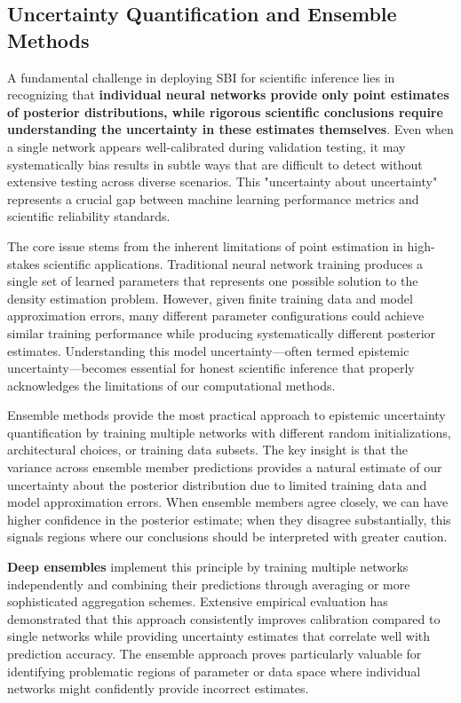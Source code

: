 \documentclass{SciPost}
\begin{document}
\subsection{Uncertainty Quantification and Ensemble Methods}

A fundamental challenge in deploying SBI for scientific inference lies in recognizing that \textbf{individual neural networks provide only point estimates of posterior distributions, while rigorous scientific conclusions require understanding the uncertainty in these estimates themselves}. Even when a single network appears well-calibrated during validation testing, it may systematically bias results in subtle ways that are difficult to detect without extensive testing across diverse scenarios. This "uncertainty about uncertainty" represents a crucial gap between machine learning performance metrics and scientific reliability standards.

The core issue stems from the inherent limitations of point estimation in high-stakes scientific applications. Traditional neural network training produces a single set of learned parameters that represents one possible solution to the density estimation problem. However, given finite training data and model approximation errors, many different parameter configurations could achieve similar training performance while producing systematically different posterior estimates. Understanding this model uncertainty—often termed epistemic uncertainty—becomes essential for honest scientific inference that properly acknowledges the limitations of our computational methods.

Ensemble methods provide the most practical approach to epistemic uncertainty quantification by training multiple networks with different random initializations, architectural choices, or training data subsets. The key insight is that the variance across ensemble member predictions provides a natural estimate of our uncertainty about the posterior distribution due to limited training data and model approximation errors. When ensemble members agree closely, we can have higher confidence in the posterior estimate; when they disagree substantially, this signals regions where our conclusions should be interpreted with greater caution.

\textbf{Deep ensembles} implement this principle by training multiple networks independently and combining their predictions through averaging or more sophisticated aggregation schemes. Extensive empirical evaluation has demonstrated that this approach consistently improves calibration compared to single networks while providing uncertainty estimates that correlate well with prediction accuracy. The ensemble approach proves particularly valuable for identifying problematic regions of parameter or data space where individual networks might confidently provide incorrect estimates.
\end{document}
